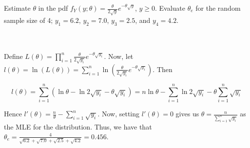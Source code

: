 Estimate $\theta$ in the pdf $f_Y(y;\theta)=\frac{\theta}{2\sqrt{y}}e^{-\theta\sqrt{y}}$, $y\geq0$.
Evaluate $\theta_e$ for the random sample size of 4; $y_1=6.2$, $y_2=7.0$, $y_3=2.5$, and $y_4=4.2$.\\\\

\begin{solution}\renewcommand{\qedsymbol}{}\ \\
    Define $L(\theta)=\prod_{i=1}^n\frac{\theta}{2\sqrt{y_i}}e^{-\theta\sqrt{y_i}}$. Now,
    let $l(\theta)=\ln(L(\theta))=\sum_{i=1}^n\ln(\frac{\theta}{2\sqrt{y_i}}e^{-\theta\sqrt{y_i}})$.
    Then
    
    $$l(\theta)=\sum_{i=1}^n(\ln\theta-\ln2\sqrt{y_i}-\theta\sqrt{y_i})=
    n\ln\theta-\sum_{i=1}^n\ln2\sqrt{y_i}-\theta\sum_{i=1}^n\sqrt{y_i}$$
    
    Hence $l'(\theta)=\frac{n}{\theta}-\sum_{i=1}^n\sqrt{y_i}$. Now, setting $l'(\theta)=0$ gives us
    $\theta=\frac{n}{\sum_{i=1}^n\sqrt{y_i}}$ as the MLE for the distribution. Thus, we have that
    $\theta_e=\frac{4}{\sqrt{6.2}+\sqrt{7.0}+\sqrt{2.5}+\sqrt{4.2}}=0.456$.

\end{solution}
